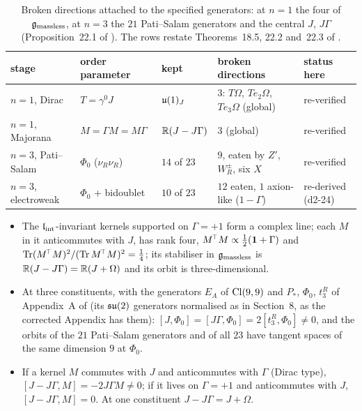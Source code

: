 \begin{table}[t]
\centering
\small
\begin{tabular}{@{}lllll@{}}
\toprule
stage & order parameter & kept & broken directions & status here\\
\midrule
$n=1$, Dirac & $T=\gamma^0J$ & $\mathfrak{u}(1)_J$ & $3$: $T\Omega$, $Te_2\Omega$, $Te_3\Omega$ (global) & re-verified\\
$n=1$, Majorana & $M=\Gamma M=M\Gamma$ & $\mathbb{R}(J-J\Gamma)$ & $3$ (global) & re-verified\\
$n=3$, Pati--Salam & $\Phi_0$ ($\nu_R\nu_R$) & $14$ of $23$ & $9$, eaten by $Z'$, $W_R^\pm$, six $X$ & re-verified\\
$n=3$, electroweak & $\Phi_0$ + bidoublet & $10$ of $23$ & $12$ eaten, $1$ axion-like ($1-\Gamma$) & re-derived (d2-24)\\
\bottomrule
\end{tabular}
\caption{Broken directions attached to the specified generators: at $n=1$ the four of $\mathfrak g_{\rm massless}$, at $n=3$ the $21$
Pati--Salam generators and the central $J$, $J\Gamma$ (Proposition~22.1 of \cite{ES17}). The rows restate Theorems~18.5, 22.2 and~22.3 of \cite{ES17}.}
\label{d2:tab:goldstone}
\end{table}

\begin{proposition}
\label{d2:prop:goldstone}
\begin{itemize}
\item[(i)] The $\mathfrak l_{\rm int}$-invariant kernels supported on $\Gamma=+1$ form a complex line; each $M$ in it anticommutes with $J$, has rank four,
$M^{\!\top}M\propto\tfrac12(\mathbf 1+\Gamma)$ and $\operatorname{Tr}(M^{\!\top}M)^2/(\operatorname{Tr} M^{\!\top}M)^2=\tfrac14$; its stabiliser in $\mathfrak g_{\rm massless}$ is
$\mathbb{R}(J-J\Gamma)=\mathbb{R}(J+\Omega)$ and its orbit is three-dimensional.
\item[(ii)] At three constituents, with the generators $E_A$ of $\mathrm{Cl}(9,9)$ and $P_*$, $\Phi_0$, $t^R_3$ of Appendix~A of \cite{ES17} (its $\mathfrak{su}(2)$ generators normalised as in Section~8, as the corrected Appendix has them): $[J,\Phi_0]=[J\Gamma,\Phi_0]=2[t^R_3,\Phi_0]\neq0$, and the orbits of the $21$ Pati--Salam generators and of all $23$ have tangent spaces
of the same dimension $9$ at $\Phi_0$.
\item[(iii)] If a kernel $M$ commutes with $J$ and anticommutes with $\Gamma$ (Dirac type), $[J-J\Gamma,M]=-2J\Gamma M\neq0$; if it lives on $\Gamma=+1$
and anticommutes with $J$, $[J-J\Gamma,M]=0$. At one constituent $J-J\Gamma=J+\Omega$.
\end{itemize}
\end{proposition}


